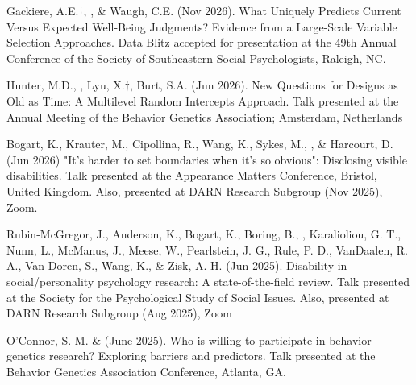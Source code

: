 \begin{etaremune}

\item Gackiere, A.E.$\dagger$, \meb, \& Waugh, C.E. (Nov 2026). What Uniquely Predicts Current Versus Expected Well-Being Judgments? Evidence from a Large-Scale Variable Selection Approaches. Data Blitz accepted for presentation at the 49th Annual Conference of the Society of Southeastern Social Psychologists, Raleigh, NC.

\item Hunter, M.D.,  \meb , Lyu, X.$\dagger$, Burt, S.A. (Jun 2026). New Questions for Designs as Old as Time: A Multilevel Random Intercepts Approach. Talk presented at the Annual Meeting of the Behavior Genetics Association; Amsterdam, Netherlands

\item Bogart, K., Krauter, M., Cipollina, R., Wang, K., Sykes, M., \meb, \& Harcourt, D. (Jun 2026) "It's harder to set boundaries when it's so obvious": Disclosing visible disabilities. Talk presented at the Appearance Matters Conference, Bristol, United Kingdom. Also, presented at DARN Research Subgroup (Nov 2025), Zoom.

\item Rubin-McGregor, J., Anderson, K., Bogart, K., Boring, B., \meb, Karalioliou, G. T., Nunn, L., McManus, J., Meese, W., Pearlstein, J. G., Rule, P. D., VanDaalen, R. A., Van Doren, S., Wang, K., \& Zisk, A. H. (Jun 2025). Disability in social/personality psychology research: A state-of-the-field review. Talk presented at the Society for the Psychological Study of Social Issues. Also, presented at DARN Research Subgroup (Aug 2025), Zoom

\item O’Connor, S. M. \& \meb (June 2025). Who is willing to participate in behavior genetics research? Exploring barriers and predictors. Talk presented at the Behavior Genetics Association Conference, Atlanta, GA.


\end{etaremune}
